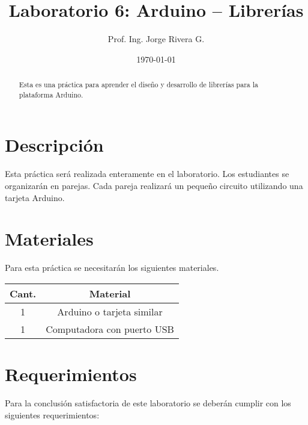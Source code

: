 \documentclass[12pt,letterpaper]{IEEEtran}
\title{Laboratorio 6: Arduino -- Librerías}
\author{Prof. Ing. Jorge Rivera G.}
\date{\today}
\begin{document}

\renewcommand{\leftmark}{UNIVERSIDAD LATINA DE COSTA RICA -- IEC-650 LABORATORIO DE SISTEMAS DIGITALES}

\maketitle


\begin{abstract}
Esta es una práctica para aprender el diseño y desarrollo de librerías para la plataforma Arduino.
\end{abstract}

\section{Descripción}

Esta práctica será realizada enteramente en el laboratorio. Los estudiantes se organizarán en parejas. Cada pareja realizará un pequeño circuito utilizando una tarjeta Arduino.

\section{Materiales}

Para esta práctica se necesitarán los siguientes materiales.

\begin{center}
\begin{tabular}{c|c}\hline
	Cant. & \hspace{2cm}Material\hspace{2cm} \\\hline\hline
	1 	& Arduino o tarjeta similar		\\\hline
	1	& Computadora con puerto USB  	\\\hline	
\end{tabular}
\end{center}

\section{Requerimientos}

Para la conclusión satisfactoria de este laboratorio se deberán cumplir con los siguientes requerimientos:
\end{document}
